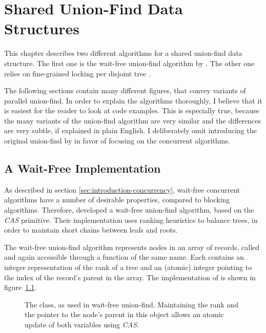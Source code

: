 \chapter{Shared Union-Find Data Structures}
\label{chpt:union-find}

This chapter describes two different algorithms for a shared union-find
\cite{Tarjan1983Data} data structure. The first one is the wait-free union-find
algorithm by \citet{Anderson1994Waitfree}. The other one relies
on fine-grained locking per disjoint tree \cite{Berman2010Multicore}.

The following sections contain many different figures, that convey variants of
parallel union-find. In order to explain the algorithms thoroughly, I believe
that it is easiest for the reader to look at code examples. This is especially
true, because the many variants of the union-find algorithm are very similar and
the differences are very subtle, if explained in plain English. I deliberately
omit introducing the original union-find by \citet{Tarjan1983Data} in favor of
focusing on the concurrent algorithms.

\section{A Wait-Free Implementation}
\label{sec:union-find-wf}

As described in section \ref{sec:introduction-concurrency}, wait-free concurrent
algorithms have a number of desirable properties, compared to blocking
algorithms. Therefore, \citet{Anderson1994Waitfree} developed a wait-free
union-find algorithm, based on the \emph{CAS} primitive. Their implementation
uses ranking heuristics to balance trees, in order to maintain short chains
between leafs and roots.

The wait-free union-find algorithm represents nodes in an array of records,
called  and again accessible through a function of the same
name. Each  contains an integer representation of the rank
of a tree and an (atomic) integer pointing to the index of the record's parent
in the array. The implementation of  is shown in
figure~\ref{fig:union-find-wf-union-record}.

\begin{figure}
  \centering
  
  \caption[The  class, as used in wait-free union-find.]{The
     class, as used in wait-free union-find. Maintaining the
    rank and the pointer to the node's parent in this object allows an atomic
    update of both variables using \emph{CAS}.}
  \label{fig:union-find-wf-union-record}
\end{figure}

